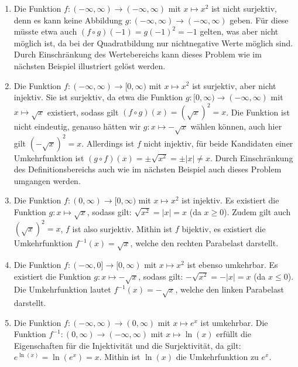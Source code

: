 \begin{example}{}{}
    \begin{enumerate}
        \item Die Funktion $f: (-\infty,\infty) \to (-\infty,\infty)$ mit $x \mapsto x^2$ ist nicht surjektiv, denn es kann keine Abbildung $g: (-\infty,\infty) \to (-\infty,\infty)$ geben. Für diese müsste etwa auch $(f \circ g)(-1) = g(-1)^2 = -1$ gelten, was aber nicht möglich ist, da bei der Quadratbildung nur nichtnegative Werte möglich sind. Durch Einschränkung des Wertebereichs kann dieses Problem wie im nächsten Beispiel illustriert gelöst werden.
        \item Die Funktion $f: (-\infty,\infty) \to [0,\infty)$ mit $x \mapsto x^2$ ist surjektiv, aber nicht injektiv. Sie ist surjektiv, da etwa die Funktion $g: [0,\infty) \to (-\infty,\infty)$ mit $x \mapsto \sqrt{x}$ existiert,  sodass gilt $(f \circ g)(x) = (\sqrt{x})^2 = x$. Die Funktion ist nicht eindeutig, genauso hätten wir $g: x \mapsto -\sqrt{x}$ wählen können, auch hier gilt $(-\sqrt{x})^2 = x$. Allerdings ist $f$ nicht injektiv, für beide Kandidaten einer Umkehrfunktion ist $(g \circ f)(x) = \pm\sqrt{x^2} = \pm|x| \ne x$. Durch Einschränkung des Definitionsbereichs auch wie im nächsten Beispiel auch dieses Problem umgangen werden.
        \item Die Funktion $f: (0,\infty) \to [0,\infty)$ mit $x \mapsto x^2$ ist injektiv. Es existiert die Funktion $g: x \mapsto \sqrt{x}$, sodass gilt: $\sqrt{x^2}=|x|=x$ (da $x\ge 0$). Zudem gilt auch $\left(\sqrt{x}\right)^2=x$, $f$ ist also surjektiv. Mithin ist $f$ bijektiv, es existiert die Umkehrfunktion $f^{-1}(x) = \sqrt{x}$, welche den rechten Parabelast darstellt.
        \item Die Funktion $f: (-\infty,0] \to [0,\infty)$ mit $x \mapsto x^2$ ist ebenso umkehrbar. Es existiert die Funktion $g: x \mapsto -\sqrt{x}$, sodass gilt: $-\sqrt{x^2}=-|x|=x$ (da $x\le 0$). Die Umkehrfunktion lautet $f^{-1}(x) = -\sqrt{x}$, welche den linken Parabelast darstellt.
        \item Die Funktion $f: (-\infty,\infty) \to (0, \infty)$ mit $x \mapsto e^x$ ist umkehrbar. Die Funktion $f^{-1}: (0, \infty) \to (-\infty,\infty)$ mit $x \mapsto \ln(x)$ erfüllt die Eigenschaften für die Injektivität und die Surjektivität, da gilt: $e^{\ln(x)} = \ln(e^x) = x$.  Mithin ist $\ln(x)$ die Umkehrfunktion zu $e^x$.
    \end{enumerate}
\end{example}


